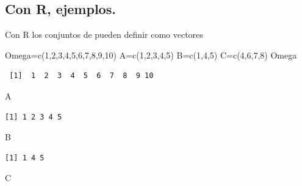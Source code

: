 \documentclass[
  letterpaper,
  DIV=11,
  numbers=noendperiod]{scrreprt}
\newenvironment{Shaded}{\begin{snugshade}}{\end{snugshade}}
\newcommand{\DecValTok}[1]{\textcolor[rgb]{0.68,0.00,0.00}{#1}}
\newcommand{\FunctionTok}[1]{\textcolor[rgb]{0.28,0.35,0.67}{#1}}
\newcommand{\NormalTok}[1]{\textcolor[rgb]{0.00,0.23,0.31}{#1}}
\newcommand{\OtherTok}[1]{\textcolor[rgb]{0.00,0.23,0.31}{#1}}
\begin{document}
\subsection{Con R, ejemplos.}\label{con-r-ejemplos.}

Con R los conjuntos de pueden definir como vectores

\begin{Shaded}
\begin{Highlighting}[]
\NormalTok{Omega}\OtherTok{=}\FunctionTok{c}\NormalTok{(}\DecValTok{1}\NormalTok{,}\DecValTok{2}\NormalTok{,}\DecValTok{3}\NormalTok{,}\DecValTok{4}\NormalTok{,}\DecValTok{5}\NormalTok{,}\DecValTok{6}\NormalTok{,}\DecValTok{7}\NormalTok{,}\DecValTok{8}\NormalTok{,}\DecValTok{9}\NormalTok{,}\DecValTok{10}\NormalTok{)}
\NormalTok{A}\OtherTok{=}\FunctionTok{c}\NormalTok{(}\DecValTok{1}\NormalTok{,}\DecValTok{2}\NormalTok{,}\DecValTok{3}\NormalTok{,}\DecValTok{4}\NormalTok{,}\DecValTok{5}\NormalTok{)}
\NormalTok{B}\OtherTok{=}\FunctionTok{c}\NormalTok{(}\DecValTok{1}\NormalTok{,}\DecValTok{4}\NormalTok{,}\DecValTok{5}\NormalTok{)}
\NormalTok{C}\OtherTok{=}\FunctionTok{c}\NormalTok{(}\DecValTok{4}\NormalTok{,}\DecValTok{6}\NormalTok{,}\DecValTok{7}\NormalTok{,}\DecValTok{8}\NormalTok{)}
\NormalTok{Omega}
\end{Highlighting}
\end{Shaded}

\begin{verbatim}
 [1]  1  2  3  4  5  6  7  8  9 10
\end{verbatim}

\begin{Shaded}
\begin{Highlighting}[]
\NormalTok{A}
\end{Highlighting}
\end{Shaded}

\begin{verbatim}
[1] 1 2 3 4 5
\end{verbatim}

\begin{Shaded}
\begin{Highlighting}[]
\NormalTok{B}
\end{Highlighting}
\end{Shaded}

\begin{verbatim}
[1] 1 4 5
\end{verbatim}

\begin{Shaded}
\begin{Highlighting}[]
\NormalTok{C}
\end{Highlighting}
\end{Shaded}
\end{document}

